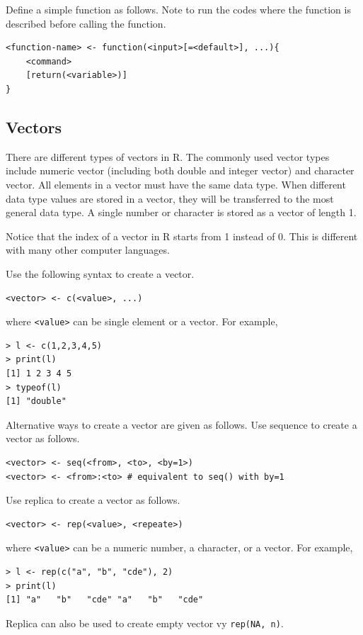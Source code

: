 Define a simple function as follows. Note to run the codes where the function is described before calling the function.
\begin{lstlisting}
<function-name> <- function(<input>[=<default>], ...){
	<command>
	[return(<variable>)]
}
\end{lstlisting}

\subsection{Vectors}

There are different types of vectors in R. The commonly used vector types include numeric vector (including both double and integer vector) and character vector. All elements in a vector must have the same data type. When different data type values are stored in a vector, they will be transferred to the most general data type. A single number or character is stored as a vector of length 1.

Notice that the index of a vector in R starts from 1 instead of 0. This is different with many other computer languages.

Use the following syntax to create a vector.
\begin{lstlisting}
<vector> <- c(<value>, ...)
\end{lstlisting}
where \verb|<value>| can be single element or a vector. For example,
\begin{lstlisting}
> l <- c(1,2,3,4,5)
> print(l)
[1] 1 2 3 4 5
> typeof(l)
[1] "double"
\end{lstlisting}

Alternative ways to create a vector are given as follows. Use sequence to create a vector as follows.
\begin{lstlisting}
<vector> <- seq(<from>, <to>, <by=1>)
<vector> <- <from>:<to> # equivalent to seq() with by=1
\end{lstlisting}

Use replica to create a vector as follows.
\begin{lstlisting}
<vector> <- rep(<value>, <repeate>)
\end{lstlisting}
where \verb|<value>| can be a numeric number, a character, or a vector. For example,
\begin{lstlisting}
> l <- rep(c("a", "b", "cde"), 2)
> print(l)
[1] "a"   "b"   "cde" "a"   "b"   "cde"
\end{lstlisting}
Replica can also be used to create empty vector vy \verb|rep(NA, n)|.

